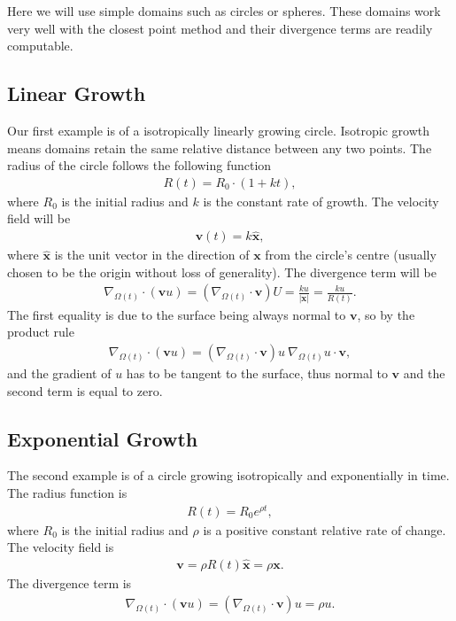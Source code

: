 \documentclass[fleqn,12pt]{siamart1116}
\begin{document}
Here we will use simple domains such as circles or spheres. These domains work very well with the closest point method and their divergence terms are readily computable.

\subsection{Linear Growth}

Our first example is of a isotropically linearly growing circle. Isotropic growth means domains retain the same relative distance between any two points. The radius of the circle follows the following function
\begin{align}
R(t) = R_0 \cdot (1 + k t),
\end{align}
where $R_0$ is the initial radius and $k$ is the constant rate of growth. The velocity field will be
\begin{align}
\mathbf{v}(t) = k \hat{\mathbf{x}},
\end{align}
where $\hat{\mathbf{x}}$ is the unit vector in the direction of $\mathbf{x}$ from the circle's centre (usually chosen to be the origin without loss of generality). The divergence term will be
\begin{align}
\nabla_{\Omega(t)} \cdot (\mathbf{v} u) = (\nabla_{\Omega(t)} \cdot \mathbf{v})U = \frac{ku}{|\mathbf{x}|} = \frac{ku}{R(t)}.
\end{align}
The first equality is due to the surface being always normal to $\mathbf{v}$, so by the product rule
\begin{align}
\nabla_{\Omega(t)} \cdot (\mathbf{v} u) = (\nabla_{\Omega(t)} \cdot \mathbf{v})u \ \nabla_{\Omega(t)} u \cdot \mathbf{v},
\end{align}
and the gradient of $u$ has to be tangent to the surface, thus normal to $\mathbf{v}$ and the second term is equal to zero.

\subsection{Exponential Growth}

The second example is of a circle growing isotropically and exponentially in time. The radius function is
\begin{align}
R(t) = R_0 e^{\rho t},\label{expRfun}
\end{align}
where $R_0$ is the initial radius and $\rho$ is a positive constant relative rate of change. The velocity field is
\begin{align}
\mathbf{v} = \rho R(t) \hat{\mathbf{x}} = \rho \mathbf{x}.
\end{align}
The divergence term is
\begin{align}
\nabla_{\Omega(t)} \cdot (\mathbf{v} u) = (\nabla_{\Omega(t)} \cdot \mathbf{v})u = \rho u.
\end{align}
\end{document}
